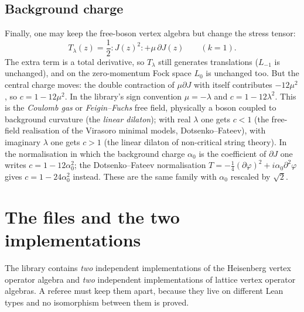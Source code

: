 \subsection{Background charge}

Finally, one may keep the free-boson vertex algebra but change the stress tensor:
\begin{equation}\label{l05:eq:Tlambda}
 T_\lambda(z)=\frac12{:}J(z)^2{:}+\mu\,\partial J(z)\qquad(k=1).
\end{equation}
The extra term is a total derivative, so $T_\lambda$ still generates translations ($L_{-1}$ is
unchanged), and on the zero-momentum Fock space $L_0$ is unchanged too. But the central charge moves:
the double contraction of $\mu\partial J$ with itself contributes $-12\mu^2$, so
$c=1-12\mu^2$. In the library's sign convention $\mu=-\lambda$ and $c=1-12\lambda^2$. This is the
\emph{Coulomb gas} or \emph{Feigin--Fuchs} free field, physically a boson coupled to background
curvature (the \emph{linear dilaton}); with real $\lambda$ one gets $c<1$ (the free-field
realisation of the Virasoro minimal models, Dotsenko--Fateev), with imaginary $\lambda$ one gets
$c>1$ (the linear dilaton of non-critical string theory). In the normalisation in which the
background charge $\alpha_0$ is the coefficient of $\partial J$ one writes $c=1-12\alpha_0^2$; the
Dotsenko--Fateev normalisation $T=-\frac14(\partial\varphi)^2+i\alpha_0\partial^2\varphi$ gives
$c=1-24\alpha_0^2$ instead. These are the same family with $\alpha_0$ rescaled by $\sqrt2$.

\section{The files and the two implementations}\label{l05:sec:map}

The library contains \emph{two} independent implementations of the Heisenberg vertex operator
algebra and \emph{two} independent implementations of lattice vertex operator algebras. A referee must
keep them apart, because they live on different Lean types and no isomorphism between them is
proved.


